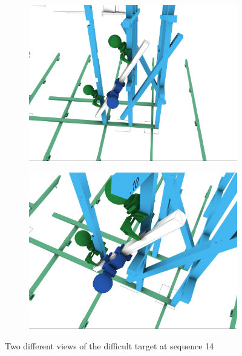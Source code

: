 \begin{figure}[!h]
    \centering
    \begin{subfigure}[b]{0.49\textwidth}
        \centering
        \includegraphics[width=\textwidth]{images/6b/img19.jpg}
    \end{subfigure}
    \hfill
    \begin{subfigure}[b]{0.49\textwidth}
        \centering
        \includegraphics[width=\textwidth]{images/6b/img20.jpg}
    \end{subfigure}
    \caption{Two different views of the difficult target at sequence 14}
    \label{fig:difficult-target-at-sequence-14}
\end{figure}


